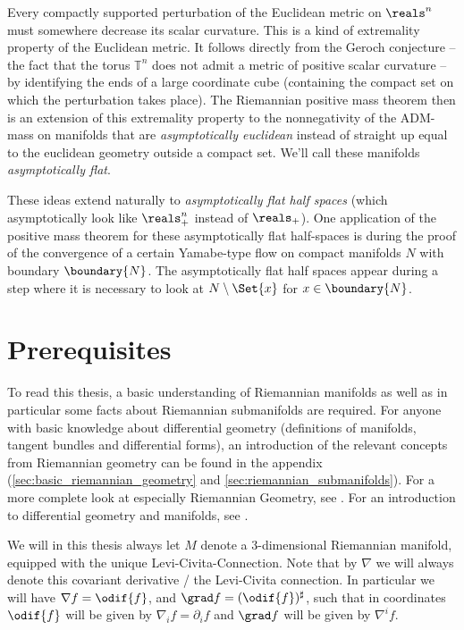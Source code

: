 \documentclass[titlepage,numbers=noenddot,headinclude,oneside,%
footinclude=true,cleardoublepage=empty,%
BCOR=5mm,paper=a4,fontsize=11pt,%
english,%
]{scrartcl}
\begin{document}
Every compactly supported perturbation of the Euclidean metric on \( \reals^n \) must somewhere decrease its scalar curvature. This is a kind of extremality property of the Euclidean metric. It follows directly from the Geroch conjecture -- the fact that the torus \( \mathbb{T}^n \) does not admit a metric of positive scalar curvature -- by identifying the ends of a large coordinate cube (containing the compact set on which the perturbation takes place). The Riemannian positive mass theorem then is an extension of this extremality property to the nonnegativity of the ADM-mass on manifolds that are \emph{asymptotically euclidean} instead of straight up equal to the euclidean geometry outside a compact set. We'll call these manifolds \emph{asymptotically flat}.

These ideas extend naturally to \emph{asymptotically flat half spaces} (which asymptotically look like \( \reals^n_+ \) instead of \( \reals_+ \)). One application of the positive mass theorem for these asymptotically flat half-spaces is during the proof \parencite{almarazConvergenceScalarflatMetrics2015} of the convergence of a  certain Yamabe-type flow on compact manifolds \( N \) with boundary \( \boundary{N} \). The asymptotically flat half spaces appear during a step where it is necessary to look at \( N\setminus \Set{x} \) for \( x\in \boundary{N} \). 

\section{Prerequisites}
To read this thesis, a basic understanding of Riemannian manifolds as well as in particular some facts about Riemannian submanifolds are required. For anyone with basic knowledge about differential geometry (definitions of manifolds, tangent bundles and differential forms), an introduction of the relevant concepts from Riemannian geometry can be found in the appendix (\cref{sec:basic_riemannian_geometry} and \cref{sec:riemannian_submanifolds}). For a more complete look at especially Riemannian Geometry, see \cite[Chapters 1 and 2]{petersenRiemannianGeometry2006}. For an introduction to differential geometry and manifolds, see \cite{leeIntroductionSmoothManifolds2012}.

We will in this thesis always let \( M \) denote a 3-dimensional Riemannian manifold, equipped with the unique Levi-Civita-Connection. Note that by \( \nabla \) we will always denote this covariant derivative / the Levi-Civita connection. In particular we will have \( \nabla f=\odif{f} \), and \( \grad f=(\odif{f})^\sharp \), such that in coordinates \( \odif{f} \) will be given by \( \nabla_i f=\partial_i f \) and \( \grad f \) will be given by \( \nabla^i     f \).
\end{document}
